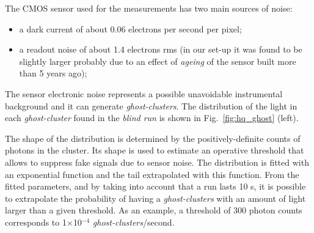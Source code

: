 \documentclass[a4paper]{jpconf}
\begin{document}
The CMOS sensor used for the measurements has two main sources of noise: 
\begin{itemize}
    \item a dark current of about 0.06 electrons per second per pixel;
    \item a readout noise of about 1.4 electrons rms (in our set-up it
      was found to be slightly larger probably due to an effect of
      {\it ageing} of the sensor built more than 5 years ago);
\end{itemize}

The sensor electronic noise represents a possible unavoidable
instrumental background and it can generate {\it ghost-clusters}.  The
distribution of the light in each {\it ghost-cluster} found in the
{\it blind run} is shown in Fig.~\ref{fig:hq_ghost} (left).

The shape of the distribution is determined by the positively-definite
counts of photons in the cluster. Its shape is used to estimate an
operative threshold that allows to suppress fake signals due to sensor
noise. The distribution is fitted with an exponential function and the
tail extrapolated with this function.  From the fitted parameters, and
by taking into account that a run lasts 10 s, it is possible to
extrapolate the probability of having a {\it ghost-clusters} with an
amount of light larger than a given threshold. As an example, a
threshold of 300 photon counts corresponds to 1$\times$10$^{-4}$ {\it
  ghost-clusters}/second.
\end{document}

